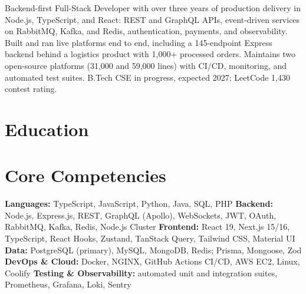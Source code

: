 \documentclass[11pt,a4paper,sans]{moderncv}
\begin{document}
\makecvtitle


\vspace{2pt}
\small{Backend-first Full-Stack Developer with over three years of production delivery in Node.js, TypeScript, and React: REST and GraphQL APIs, event-driven services on RabbitMQ, Kafka, and Redis, authentication, payments, and observability. Built and ran live platforms end to end, including a 145-endpoint Express backend behind a logistics product with 1,000+ processed orders. Maintains two open-source platforms (31,000 and 59,000 lines) with CI/CD, monitoring, and automated test suites. B.Tech CSE in progress, expected 2027; LeetCode 1,430 contest rating.}


\section{Education}
\vspace{1pt}


\section{Core Competencies}
\vspace{1pt}
\raggedright
\textbf{Languages:} TypeScript, JavaScript, Python, Java, SQL, PHP \textbar{}
\textbf{Backend:} Node.js, Express.js, REST, GraphQL (Apollo), WebSockets, JWT, OAuth, RabbitMQ, Kafka, Redis, Node.js Cluster \textbar{}
\textbf{Frontend:} React 19, Next.js 15/16, TypeScript, React Hooks, Zustand, TanStack Query, Tailwind CSS, Material UI \textbar{}
\textbf{Data:} PostgreSQL (primary), MySQL, MongoDB, Redis; Prisma, Mongoose, Zod \textbar{}
\textbf{DevOps \& Cloud:} Docker, NGINX, GitHub Actions CI/CD, AWS EC2, Linux, Coolify \textbar{}
\textbf{Testing \& Observability:} automated unit and integration suites, Prometheus, Grafana, Loki, Sentry
\par\normalfont
\end{document}
